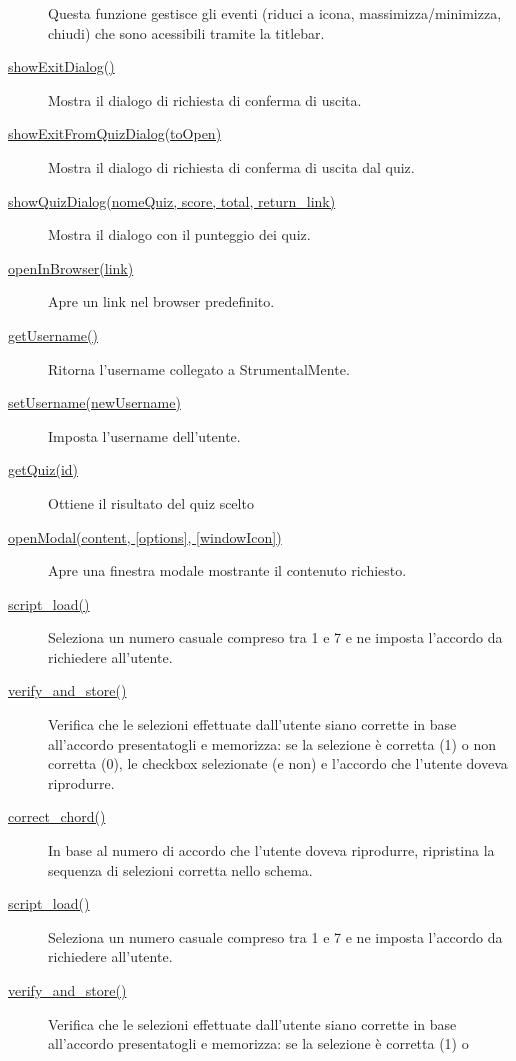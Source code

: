 \begin{description}
Questa funzione gestisce gli eventi (riduci a icona,
massimizza/minimizza, chiudi) che sono acessibili tramite la titlebar.
\item[{ \protect\hyperlink{showExitDialog}{showExitDialog()} }]
Mostra il dialogo di richiesta di conferma di uscita.
\item[{
\protect\hyperlink{showExitFromQuizDialog}{showExitFromQuizDialog(toOpen)}
}]
Mostra il dialogo di richiesta di conferma di uscita dal quiz.
\item[{ \protect\hyperlink{showQuizDialog}{showQuizDialog(nomeQuiz,
score, total, return\_link)} }]
Mostra il dialogo con il punteggio dei quiz.
\item[{ \protect\hyperlink{openInBrowser}{openInBrowser(link)} }]
Apre un link nel browser predefinito.
\item[{ \protect\hyperlink{getUsername}{getUsername()} }]
Ritorna l'username collegato a StrumentalMente.
\item[{ \protect\hyperlink{setUsername}{setUsername(newUsername)} }]
Imposta l'username dell'utente.
\item[{ \protect\hyperlink{getQuiz}{getQuiz(id)} }]
Ottiene il risultato del quiz scelto
\item[{ \protect\hyperlink{openModal}{openModal(content, {[}options{]},
{[}windowIcon{]})} }]
Apre una finestra modale mostrante il contenuto richiesto.
\item[{ \protect\hyperlink{script_load}{script\_load()} }]
Seleziona un numero casuale compreso tra 1 e 7 e ne imposta l'accordo da
richiedere all'utente.
\item[{ \protect\hyperlink{verify_and_store}{verify\_and\_store()} }]
Verifica che le selezioni effettuate dall'utente siano corrette in base
all'accordo presentatogli e memorizza: se la selezione è corretta (1) o
non corretta (0), le checkbox selezionate (e non) e l'accordo che
l'utente doveva riprodurre.
\item[{ \protect\hyperlink{correct_chord}{correct\_chord()} }]
In base al numero di accordo che l'utente doveva riprodurre, ripristina
la sequenza di selezioni corretta nello schema.
\item[{ \protect\hyperlink{script_load}{script\_load()} }]
Seleziona un numero casuale compreso tra 1 e 7 e ne imposta l'accordo da
richiedere all'utente.
\item[{ \protect\hyperlink{verify_and_store}{verify\_and\_store()} }]
Verifica che le selezioni effettuate dall'utente siano corrette in base
all'accordo presentatogli e memorizza: se la selezione è corretta (1) o

\end{description}
